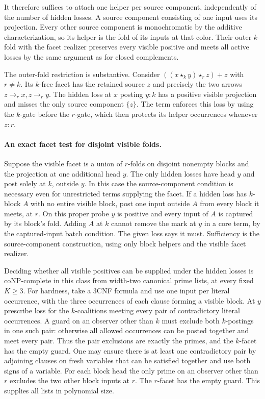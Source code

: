 It therefore suffices to attach one helper per
source component, independently of the number of
hidden losses. A source component consisting of
one input uses its projection. Every other source
component is monochromatic by the additive
characterization, so its helper is the fold of its
inputs at that color. Their outer $k$-fold with the
facet realizer preserves every visible positive
and meets all active losses by the same argument
as for closed complements.

The outer-fold restriction is substantive. Consider
$((x\star_k y)\star_r z)+z$ with $r\ne k$.
Its $k$-free facet has the retained source $z$
and precisely the two arrows $z\to_r x,z\to_r y$.
The hidden loss at $x$ posting $y:k$ has a positive
visible projection and misses the only source
component $\{z\}$. The term enforces this loss by
using the $k$-gate before the $r$-gate, which then
protects its helper occurrences whenever $z:r$.

\paragraph{An exact facet test for disjoint visible folds.}
Suppose the visible facet is a union of $r$-folds
on disjoint nonempty blocks and the projection at
one additional head $y$. The only hidden losses
have head $y$ and post solely at $k$, outside $y$.
In this case the source-component condition is
necessary even for unrestricted terms supplying
the facet. If a hidden loss has $k$-block $A$
with no entire visible block, post one input
outside $A$ from every block it meets, at $r$.
On this proper probe $y$ is positive and every
input of $A$ is captured by its block's fold.
Adding $A$ at $k$ cannot remove the mark at $y$
in a core term, by the captured-input batch
condition. The given loss says it must. Sufficiency
is the source-component construction, using only
block helpers and the visible facet realizer.

Deciding whether all visible positives can be
supplied under the hidden losses is coNP-complete
in this class from width-two canonical prime lists,
at every fixed $K\ge3$. For hardness, take a 3CNF
formula and use one input per literal occurrence,
with the three occurrences of each clause forming
a visible block. At $y$ prescribe loss for the
$k$-coalitions meeting every pair of contradictory
literal occurrences. A guard on an observer other
than $k$ must exclude both $k$-postings in one
such pair: otherwise all allowed occurrences can
be posted together and meet every pair. Thus the
pair exclusions are exactly the primes, and the
$k$-facet has the empty guard. One may ensure there
is at least one contradictory pair by adjoining
clauses on fresh variables that can be satisfied
together and use both signs of a variable. For
each block head the only prime on an observer
other than $r$ excludes the two other block
inputs at $r$. The $r$-facet has the empty guard.
This supplies all lists in polynomial size.

